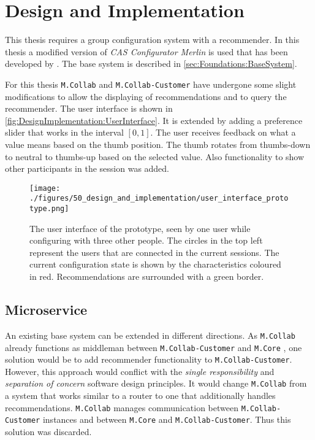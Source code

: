 \chapter{Design and Implementation}
\label{ch:DesignImplementation}

This thesis requires a group configuration system with a recommender. In this thesis a modified version of \emph{CAS Configurator Merlin} \cite{IndustrySpecificProduct2020} is used that has been developed by \citeauthor{raabKollaborativeProduktkonfigurationEchtzeit2019} \cite{raabKollaborativeProduktkonfigurationEchtzeit2019}. The base system is described in \autoref{sec:Foundations:BaseSystem}.

For this thesis \texttt{M.Collab} and \texttt{M.Collab-Customer} have undergone some slight modifications to allow the displaying of recommendations and to query the recommender. The user interface is shown in \autoref{fig:DesignImplementation:UserInterface}. It is extended by adding a preference slider that works in the interval $[0,1]$. The user receives feedback on what a value means based on the thumb position. The thumb rotates from thumbs-down to neutral to thumbs-up based on the selected value. Also functionality to show other participants in the session was added.
\begin{figure}[htb]
    \centering
    \texttt{[image: ./figures/50\_design\_and\_implementation/user\_interface\_prototype.png]}
    \caption[User Interface]{The user interface of the prototype, seen by one user while configuring with three other people. The circles in the top left represent the users that are connected in the current sessions. The current configuration state is shown by the characteristics coloured in red. Recommendations are surrounded with a green border.}
    \label{fig:DesignImplementation:UserInterface}
\end{figure}


\section{Microservice}
\label{sec:DesignImplementation:Microservice}

An existing base system can be extended in different directions. As \texttt{M.Collab} already functions as middleman between \texttt{M.Collab-Customer} and \texttt{M.Core} , one solution would be to add recommender functionality to \texttt{M.Collab-Customer}. However, this approach would conflict with the \emph{single responsibility} \cite{martinCleanArchitectureCraftsman2017} and \emph{separation of concern} \cite{de2002importance} software design principles. It would change \texttt{M.Collab} from a system that works similar to a router to one that additionally handles  recommendations. \texttt{M.Collab} manages communication between \texttt{M.Collab-Customer} instances and between \texttt{M.Core} and \texttt{M.Collab-Customer}. Thus this solution was discarded.

